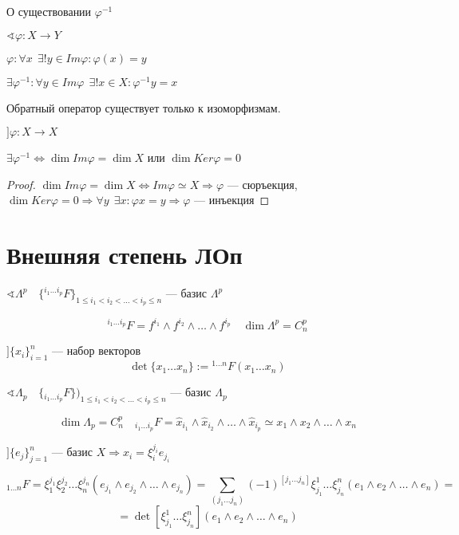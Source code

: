 О существовании $\varphi^{-1}$

$\sphericalangle \varphi: X\to Y$

$\varphi : \forall x \ \ \exists! y\in Im \varphi : \varphi(x)=y$

$\exists \varphi^{-1} : \forall y\in Im \varphi \ \ \exists! x\in X : \varphi^{-1}y=x$

Обратный оператор существует только к изоморфизмам.

\begin{theorem}
    $] \varphi : X\to X$
    
    $\exists \varphi^{-1} \Leftrightarrow \dim Im \varphi=\dim X$ или $\dim Ker \varphi = 0$
\end{theorem}
\begin{proof}
    $\dim Im \varphi=\dim X \Leftrightarrow Im \varphi \simeq X \Rightarrow \varphi $ --- сюръекция, $\dim Ker \varphi = 0 \Rightarrow \forall y \ \ \exists x : \varphi x = y \Rightarrow \varphi$ --- инъекция
\end{proof}

\section{Внешняя степень ЛОп}

$\sphericalangle \Lambda^p \quad \{{}^{i_1\ldots i_p} F\}_{1\leq i_1<i_2<\ldots<i_p\leq n}$ --- базис $\Lambda^p$

$${}^{i_1\ldots i_p} F=f^{i_1}\wedge f^{i_2}\wedge \ldots \wedge f^{i_p} \quad \dim \Lambda^p=C^p_n$$

$] \{x_i\}_{i=1}^n$ --- набор векторов
$$\det \{x_1\ldots x_n\}:={}^{1\ldots n}F(x_1\ldots x_n)$$

$\sphericalangle \Lambda_p \quad \{{}_{i_1\ldots i_p} F\})_{1\leq i_1<i_2<\ldots<i_p\leq n}$ --- базис $\Lambda_p$

$$\dim\Lambda_p=C_n^p \quad {}_{i_1\ldots i_p} F = \hat x_{i_1}\wedge \hat x_{i_2}\wedge\ldots\wedge\hat x_{i_p}\simeq x_1\wedge x_2\wedge\ldots\wedge x_n$$

$] \{e_j\}_{j=1}^n$ --- базис $X \Rightarrow x_i=\xi^{j_i}_i e_{j_i}$

$${}_{1\ldots n} F = \xi_1^{j_1}\xi_2^{j_2}\ldots \xi_n^{j_n}(e_{j_1}\wedge e_{j_2}\wedge\ldots\wedge e_{j_n})=\sum\limits_{(j_1\ldots j_n)} (-1)^{[j_1\ldots j_n]} \xi^1_{j_1}\ldots \xi^n_{j_n} (e_{1}\wedge e_{2}\wedge\ldots\wedge e_{n})=$$
$$=\det [\xi^1_{j_1}\ldots \xi^n_{j_n}](e_{1}\wedge e_{2}\wedge\ldots\wedge e_{n})$$

